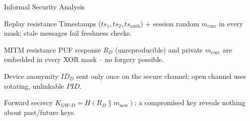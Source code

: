 \begin{frame}{Informal Security Analysis}
    \footnotesize
    \noindent\begin{minipage}{0.54\textwidth}
        \begin{block}{Replay resistance}
            Timestamps ($ts_1,ts_2,ts_{\mathrm{auth}}$) + session random
            $m_{\mathrm{curr}}$ in every mask; stale messages fail freshness checks.
        \end{block}
    \end{minipage}\par
    \vspace{-0.15cm}
    \noindent\hspace*{\fill}\begin{minipage}{0.54\textwidth}
        \begin{block}{MITM resistance}
            PUF response $R_D$ (unreproducible) and private $m_{\mathrm{curr}}$
            are embedded in every XOR mask -- no forgery possible.
        \end{block}
    \end{minipage}\par
    \vspace{-0.15cm}
    \noindent\begin{minipage}{0.54\textwidth}
        \begin{block}{Device anonymity}
            $ID_D$ sent only once on the secure channel; open channel uses
            rotating, unlinkable $\mathit{PID}$.
        \end{block}
    \end{minipage}\par
    \vspace{-0.15cm}
    \noindent\hspace*{\fill}\begin{minipage}{0.54\textwidth}
        \begin{block}{Forward secrecy}
            $K_{GW\text{-}D}=H(R_D\|m_{\mathrm{new}})$; a compromised key reveals
            nothing about past/future keys.
        \end{block}
    \end{minipage}\par
\end{frame}

